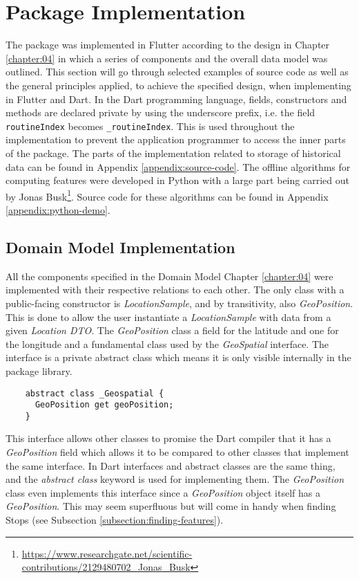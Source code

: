 \section{Package Implementation}
The package was implemented in Flutter according to the design in Chapter \ref{chapter:04} in which a series of components and the overall data model was outlined. This section will go through selected examples of source code as well as the general principles applied, to achieve the specified design, when implementing in Flutter and Dart. In the Dart programming language, fields, constructors and methods are declared private by using the underscore prefix, i.e. the field \verb|routineIndex| becomes \verb|_routineIndex|. This is used throughout the implementation to prevent the application programmer to access the inner parts of the package. The parts of the implementation related to storage of historical data can be found in Appendix \ref{appendix:source-code}. The offline algorithms for computing features were developed in Python with a large part being carried out by Jonas Busk\footnote{\url{https://www.researchgate.net/scientific-contributions/2129480702_Jonas_Busk}}. Source code for these algorithms can be found in Appendix \ref{appendix:python-demo}.

\subsection{Domain Model Implementation}
All the components specified in the Domain Model Chapter \ref{chapter:04} were implemented with their respective relations to each other. The only class with a public-facing constructor is \textit{LocationSample}, and by transitivity, also \textit{GeoPosition}. This is done to allow the user instantiate a \textit{LocationSample} with data from a given \textit{Location DTO}. The \textit{GeoPosition} class a field for the latitude and one for the longitude and a fundamental class used by the \textit{GeoSpatial} interface. The interface is a private abstract class which means it is only visible internally in the package library.

\begin{verbatim}
    abstract class _Geospatial {
      GeoPosition get geoPosition;
    }
\end{verbatim}

This interface allows other classes to promise the Dart compiler that it has a \textit{GeoPosition} field which allows it to be compared to other classes that implement the same interface. In Dart interfaces and abstract classes are the same thing, and the \textit{abstract class} keyword is used for implementing them. The \textit{GeoPosition} class even implements this interface since a \textit{GeoPosition} object itself has a \textit{GeoPosition}. This may seem superfluous but will come in handy when finding Stops (see Subsection \ref{subsection:finding-features}).

